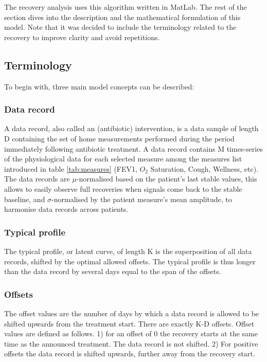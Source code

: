 The recovery analysis uses this algorithm written in MatLab. The rest of the section dives into the description and the mathematical formulation of this model. Note that it was decided to include the terminology related to the recovery to improve clarity and avoid repetitions.

\subsection{Terminology} \label{sec:datainputs}
To begin with, three main model concepts can be described:

\subsubsection{Data record}A data record, also called an (antibiotic) intervention, is a data sample of length D containing the set of home measurements performed during the period immediately following antibiotic treatment. A data record contains M times-series of the physiological data for each selected measure among the measures list introduced in table \ref{tab:measures} (FEV1, $O_2$ Saturation, Cough, Wellness, etc). The data records are $\mu$-normalised based on the patient's last stable values, this allows to easily observe full recoveries when signals come back to the stable baseline, and $\sigma$-normalised by the patient measure's mean amplitude, to harmonise data records across patients.

\subsubsection{Typical profile}The typical profile, or latent curve, of length K is the superposition of all data records, shifted by the optimal allowed offsets. The typical profile is thus longer than the data record by several days equal to the span of the offsets.

\subsubsection{Offsets}The offset values are the number of days by which a data record is allowed to be shifted upwards from the treatment start. There are exactly K-D offsets. Offset values are defined as follows. 1) for an offset of 0 the recovery starts at the same time as the announced treatment. The data record is not shifted. 2) For positive offsets the data record is shifted upwards, further away from the recovery start.

